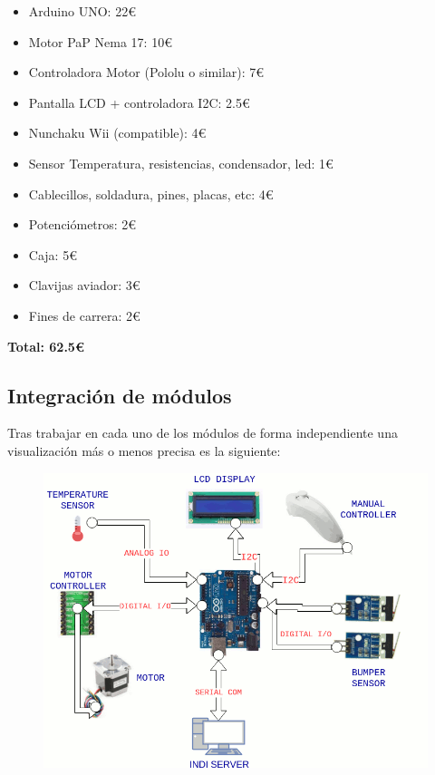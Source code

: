 \begin{itemize}
	\item Arduino UNO: 22\euro
	\item Motor PaP Nema 17: 10\euro
	\item Controladora Motor (Pololu o similar): 7\euro
	\item Pantalla LCD + controladora I2C: 2.5\euro
	\item Nunchaku Wii (compatible): 4\euro
	\item Sensor Temperatura, resistencias, condensador, led: 1\euro
	\item Cablecillos, soldadura, pines, placas, etc: 4\euro
	\item Potenciómetros: 2\euro
	\item Caja: 5\euro
	\item Clavijas aviador: 3\euro
	\item Fines de carrera: 2\euro
	
	
\end{itemize}
\textbf{Total: 62.5\euro}

\subsection{Integración de módulos}
\bigskip
Tras trabajar en cada uno de los módulos de forma independiente una visualización más o menos precisa es la siguiente:

\begin{figure}[h]
	\centering
	\includegraphics[width=0.9\linewidth]{../images/diagramaHardware}
	\caption{}
	\label{fig:diagramaHardware}
\end{figure}

